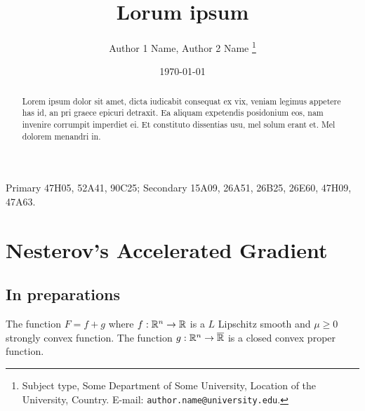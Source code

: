 \documentclass[12pt]{article}
\begin{document}
\title{{\selectfont Lorum ipsum}}

\author{
    Author 1 Name, Author 2 Name
    \thanks{
        Subject type, Some Department of Some University, Location of the University,
        Country. E-mail: \texttt{author.name@university.edu}.
    }
}

\date{\today}

\maketitle
{}

\begin{abstract} 
    \noindent
    Lorem ipsum dolor sit amet, dicta iudicabit consequat ex vix, veniam legimus appetere has id, an pri graece epicuri detraxit. Ea aliquam expetendis posidonium eos, nam invenire corrumpit imperdiet ei. Et constituto dissentias usu, mel solum erant et. Mel dolorem menandri in.
    \cite{nesterov_lectures_2018}
\end{abstract}

Primary 47H05, 52A41, 90C25; Secondary 15A09, 26A51, 26B25, 26E60, 47H09, 47A63.


\section{Nesterov's Accelerated Gradient}
    \subsection{In preparations}
        \begin{assumption}\label{ass:smooth_plus_nonsmooth}
            The function $F = f + g$ where $f:\mathbb R^n \rightarrow \mathbb R$ is a $L$ Lipschitz smooth and $\mu \ge 0$ strongly convex function. 
            The function $g:\mathbb R^n \rightarrow \overline {\mathbb R}$ is a closed convex proper function. 
        \end{assumption}
\end{document}
